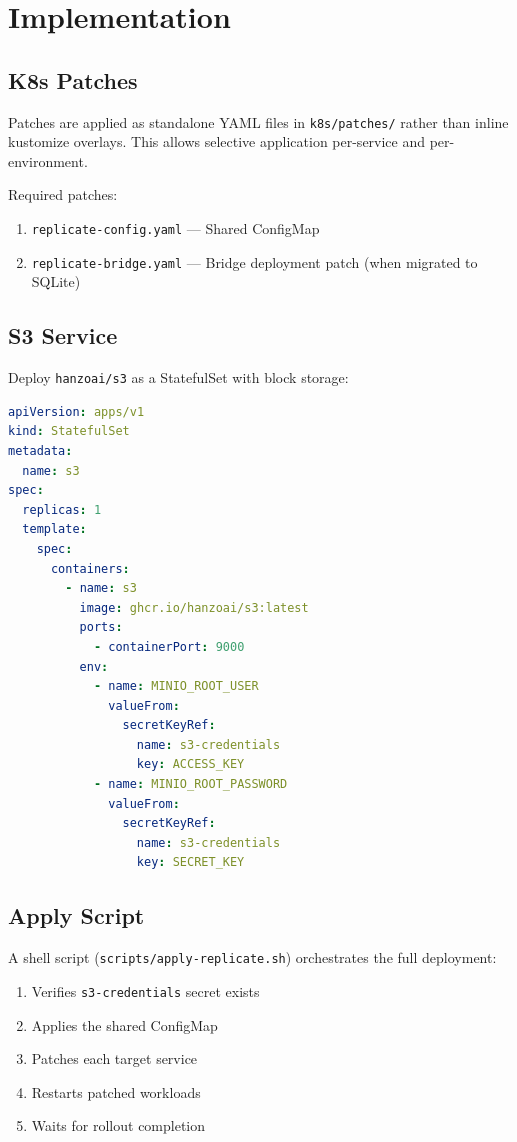 \documentclass[twocolumn,11pt]{article}
\begin{document}
\section{Implementation}

\subsection{K8s Patches}

Patches are applied as standalone YAML files in
\texttt{k8s/patches/} rather than inline kustomize overlays.
This allows selective application per-service and per-environment.

Required patches:
\begin{enumerate}
\item \texttt{replicate-config.yaml} --- Shared ConfigMap
\item \texttt{replicate-bridge.yaml} --- Bridge deployment patch
  (when migrated to SQLite)
\end{enumerate}

\subsection{S3 Service}

Deploy \texttt{hanzoai/s3} as a StatefulSet with block storage:

\begin{lstlisting}[language=yaml,caption={S3 service (MinIO)}]
apiVersion: apps/v1
kind: StatefulSet
metadata:
  name: s3
spec:
  replicas: 1
  template:
    spec:
      containers:
        - name: s3
          image: ghcr.io/hanzoai/s3:latest
          ports:
            - containerPort: 9000
          env:
            - name: MINIO_ROOT_USER
              valueFrom:
                secretKeyRef:
                  name: s3-credentials
                  key: ACCESS_KEY
            - name: MINIO_ROOT_PASSWORD
              valueFrom:
                secretKeyRef:
                  name: s3-credentials
                  key: SECRET_KEY
\end{lstlisting}

\subsection{Apply Script}

A shell script (\texttt{scripts/apply-replicate.sh}) orchestrates
the full deployment:

\begin{enumerate}
\item Verifies \texttt{s3-credentials} secret exists
\item Applies the shared ConfigMap
\item Patches each target service
\item Restarts patched workloads
\item Waits for rollout completion
\end{enumerate}
\end{document}
